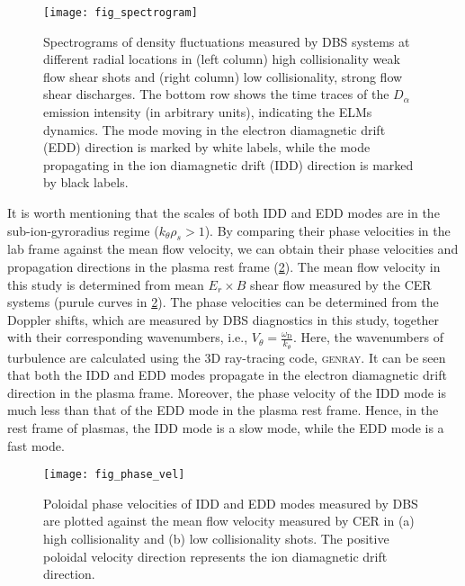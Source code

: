 \documentclass[english,aip,pop,superscriptaddress,preprint,letterpaper]{revtex4-2}
\begin{document}
\begin{figure}
    \texttt{[image: fig\_spectrogram]}
    \caption{\label{fig:spectrogram}Spectrograms of density fluctuations measured by DBS systems at different radial locations in (left column) high collisionality weak flow shear shots and (right column) low collisionality, strong flow shear discharges. The bottom row shows the time traces of the $ D_\alpha $ emission intensity (in arbitrary units), indicating the ELMs dynamics. The mode moving in the electron diamagnetic drift (EDD) direction is marked by white labels, while the mode propagating in the ion diamagnetic drift (IDD) direction is marked by black labels.}
\end{figure}

It is worth mentioning that the scales of both IDD and EDD modes are in the sub-ion-gyroradius regime (\(k_{\theta}\rho_{s}>1\)).
By comparing their phase velocities in the lab frame against the mean flow velocity, we can obtain their phase velocities and propagation directions in the plasma rest frame (\cref{fig:phase_vel}).
The mean flow velocity in this study is determined from mean $ E_r \times B $ shear flow measured by the CER systems (purule curves in \cref{fig:phase_vel}).
The phase velocities can be determined from the Doppler shifts, which are measured by DBS diagnostics in this study, together with their corresponding wavenumbers, i.e., $ V_\theta = \frac{\omega_\mathrm{D}}{k_\theta}$.
Here, the wavenumbers of turbulence are calculated using the 3D ray-tracing code, \textsc{genray}.
It can be seen that both the IDD and EDD modes propagate in the electron diamagnetic drift direction in the plasma frame.
Moreover, the phase velocity of the IDD mode is much less than that of the EDD mode in the plasma rest frame.
Hence, in the rest frame of plasmas, the IDD mode is a slow mode, while the EDD mode is a fast mode.

\begin{figure}
    \texttt{[image: fig\_phase\_vel]}
    \caption{\label{fig:phase_vel}Poloidal phase velocities of IDD and EDD modes measured by DBS are plotted against the mean flow velocity measured by CER in (a) high collisionality and (b) low collisionality shots. The positive poloidal velocity direction represents the ion diamagnetic drift direction.}
\end{figure}
\end{document}
